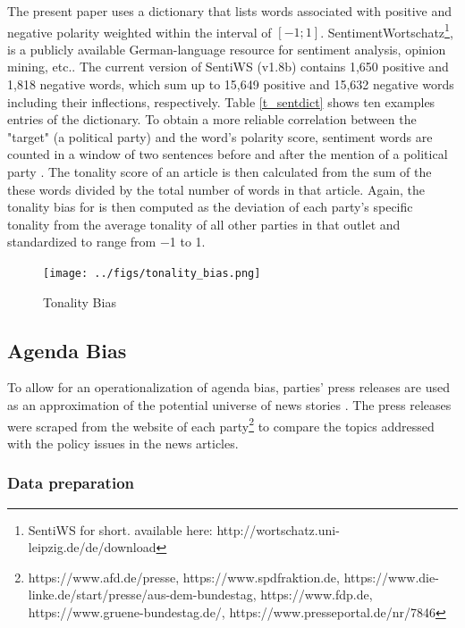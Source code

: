 \documentclass[12pt,a4paper,notitlepage]{article}
\begin{document}
The present paper uses a dictionary that lists words associated with positive and negative polarity weighted within the interval of $[-1; 1]$. SentimentWortschatz\footnote{SentiWS for short. available here: http://wortschatz.uni-leipzig.de/de/download}, is a publicly available German-language resource for sentiment analysis, opinion mining, etc.. The current version of SentiWS (v1.8b) contains 1,650 positive and 1,818 negative words, which sum up to 15,649 positive and 15,632 negative words including their inflections, respectively. Table \ref{t_sentdict} shows ten examples entries of the dictionary. To obtain a more reliable correlation between the "target" (a political party) and the word's polarity score, sentiment words are counted in a window of two sentences before and after the mention of a political party \citep{junque_de_fortuny_media_2012}. The tonality score of an article is then calculated from the sum of the these words divided by the total number of words in that article. Again, the tonality bias for is then computed as the deviation of each party's specific tonality from the average tonality of all other parties in that outlet and standardized to range from −1 to 1.


 
\begin{figure}[H]
	\caption{Tonality Bias}
	\begin{center}
		\texttt{[image: ../figs/tonality\_bias.png]}
		\label{fig_tonality_bias}
	\end{center}
\end{figure}


\subsection{Agenda Bias}\label{ch_agendabias}

To allow for an operationalization of agenda bias, parties' press releases are used as an approximation of the potential universe of news stories \citep{eberl_one_2017}. The press releases were scraped from the website of each party\footnote{https://www.afd.de/presse, https://www.spdfraktion.de, https://www.die-linke.de/start/presse/aus-dem-bundestag, https://www.fdp.de, https://www.gruene-bundestag.de/, https://www.presseportal.de/nr/7846} to compare the topics addressed with the policy issues in the news articles. 

\subsubsection{Data preparation}
\end{document}
